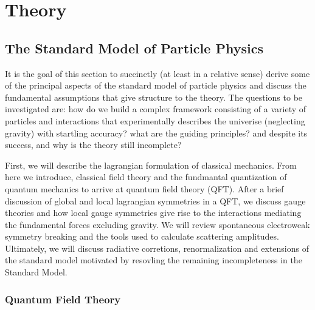 \chapter{Theory}

\section{The Standard Model of Particle Physics}

It is the goal of this section to succinctly (at least in a relative sense) derive some of the 
principal aspects of the standard model of particle physics and discuss the fundamental assumptions 
that give structure to the theory. The questions to be investigated are: how do we build
 a complex framework consisting of a variety of particles and interactions that
  experimentally describes the univerise (neglecting gravity) with startling accuracy? 
what are the guiding principles? and despite its success, and why is the theory still incomplete?

First, we will describe the lagrangian formulation of classical mechanics. From here we introduce, 
classical field theory and the fundmantal quantization of quantum mechanics to arrive at quantum field
theory (QFT). After a brief discussion of global and local lagrangian symmetries in a QFT, we discuss
gauge theories and how local gauge symmetries give rise to the interactions mediating the 
fundamental forces excluding gravity. We will review spontaneous 
electroweak symmetry breaking and the tools used to calculate scattering amplitudes. Ultimately, we 
will discuss radiative corretions, renormalization and extensions of the standard model  motivated by resovling
the remaining incompleteness in the Standard Model.


\subsection{Quantum Field Theory}

